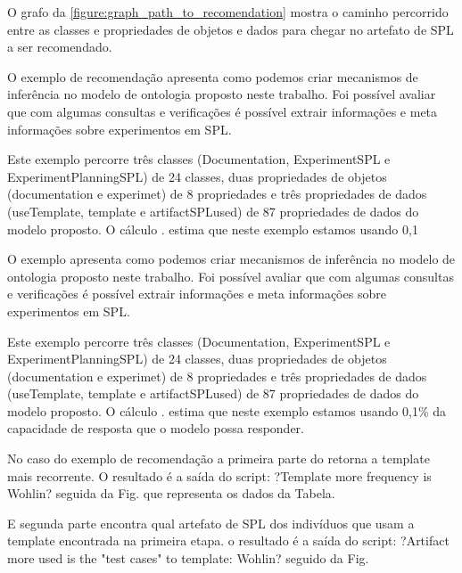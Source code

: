 O grafo da \ref{figure:graph_path_to_recomendation} mostra o caminho percorrido entre as classes e propriedades de objetos e dados para chegar no artefato de SPL a ser recomendado.

O exemplo de recomendação apresenta como podemos criar mecanismos de inferência no modelo de ontologia proposto neste trabalho. Foi possível avaliar que com algumas consultas e verificações é possível extrair informações e meta informações sobre experimentos em SPL. 

Este exemplo percorre três classes (Documentation, ExperimentSPL e ExperimentPlanningSPL) de 24 classes, duas propriedades de objetos (documentation e experimet) de 8 propriedades e três propriedades de dados (useTemplate, template e artifactSPLused) de 87 propriedades de dados do modelo proposto. O cálculo . estima que neste exemplo estamos usando 0,1%


O exemplo apresenta como podemos criar mecanismos de inferência no modelo de ontologia proposto neste trabalho. Foi possível avaliar que com algumas consultas e verificações é possível extrair informações e meta informações sobre experimentos em SPL. 

Este exemplo percorre três classes (Documentation, ExperimentSPL e ExperimentPlanningSPL) de 24 classes, duas propriedades de objetos (documentation e experimet) de 8 propriedades e três propriedades de dados (useTemplate, template e artifactSPLused) de 87 propriedades de dados do modelo proposto. O cálculo . estima que neste exemplo estamos usando 0,1\% da capacidade de resposta que o modelo possa responder.



No caso do exemplo de recomendação a primeira parte do retorna a template mais recorrente. O resultado é a saída do script: ?Template more frequency is Wohlin? seguida da Fig. que representa os dados da Tabela.

E segunda parte encontra qual artefato de SPL dos indivíduos que usam a template encontrada na primeira etapa. o resultado é a saída do script: ?Artifact more used is the "test cases" to template: Wohlin? seguido da Fig.

